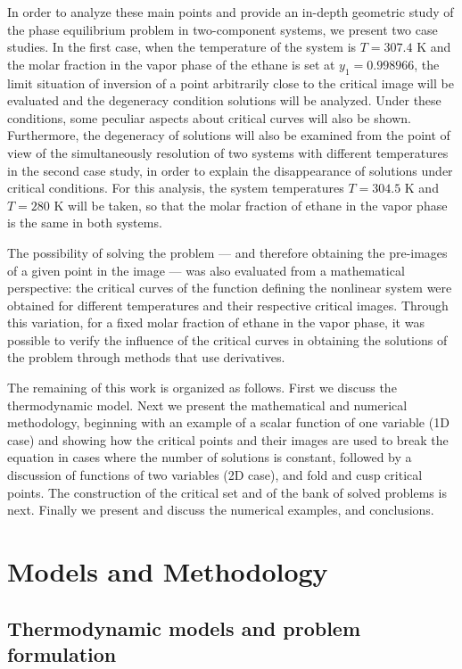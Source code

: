 \documentclass[journal=iecred,manuscript=article]{achemso}
\theoremstyle{definition}
\theoremstyle{remark}
\begin{document}
In order to analyze these main points and provide an in-depth geometric study of the phase equilibrium problem in two-component systems, we present two case studies. In the first case, when the temperature of the system is $ T = 307.4 $ K and the molar fraction in the vapor phase of the ethane is set at $ y_{1} = 0.998966 $, the limit situation of inversion of a point arbitrarily close to the critical image will be evaluated and the degeneracy condition solutions will be analyzed. Under these conditions, some peculiar aspects about critical curves will also be shown. Furthermore, the degeneracy of solutions will also be examined from the point of view of the simultaneously resolution of two systems with different temperatures in the second case study, in order to explain the disappearance of solutions under critical conditions. For this analysis, the system temperatures $ T = 304.5 $ K and $ T = 280 $ K will be taken, so that the molar fraction of ethane in the vapor phase is the same in both systems.

The possibility of solving the problem --- and therefore obtaining the pre-images of a given point in the image --- was also evaluated from a mathematical perspective: the critical curves of the function defining  the nonlinear system were obtained for different temperatures and their respective critical images. Through this variation, for a fixed molar fraction of ethane in the vapor phase, it was possible to verify the influence of the critical curves in obtaining the solutions of the problem through methods that use derivatives.

The remaining of this work is organized as follows. First we discuss the thermodynamic model. Next we present the mathematical and numerical methodology, beginning with an example of a scalar function of one variable (1D case) and showing how the critical points and their images are used to break the equation in cases where the number of solutions is constant, followed by  a discussion of functions of two variables (2D case), and fold and cusp critical points. The construction of the critical set and of the bank of solved problems is next. Finally we present and discuss the numerical examples, and conclusions.

\section{Models and Methodology}

\subsection{Thermodynamic models and problem formulation}
\end{document}
